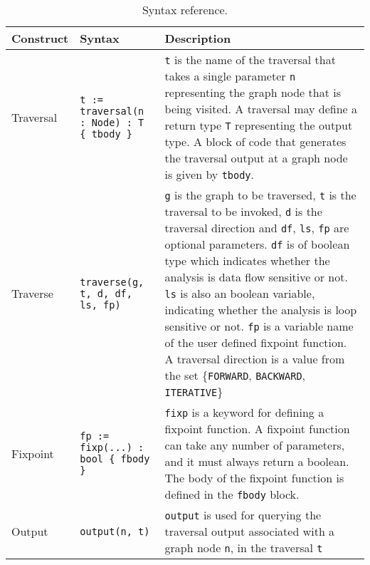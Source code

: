 \begin{table*}[ht!] \centering \small
\caption{Syntax reference.}
\label{tab:syntax}
\begin{tabular}{|p{1.5cm}|p{2.5cm}|p{11cm}|}
\hline 
\textbf{Construct} & \textbf{Syntax} & \textbf{Description}\\\hline
Traversal & \lstinline|t := traversal(n : Node) : T { tbody }| & \lstinline|t| is the name of the traversal that takes a single parameter \lstinline|n| representing the graph node that is being visited. A traversal may define a return type \lstinline|T| representing the output type. A block of code that generates the traversal output at a graph node is given by \lstinline|tbody|.\\\hline
Traverse & \lstinline|traverse(g, t, d, df, ls, fp)| & \lstinline|g| is the
graph to be traversed, \lstinline|t| is the traversal to be invoked,
\lstinline|d| is the traversal direction and \lstinline|df|, \lstinline|ls|, \lstinline|fp| are optional
parameters. \lstinline|df| is of boolean type which indicates whether the analysis is data flow sensitive or not. \lstinline|ls| is also an boolean variable, indicating whether the analysis is loop sensitive or not. \lstinline|fp| is a variable name of the user defined fixpoint function. A traversal direction is a value from the set \{\lstinline|FORWARD|,
\lstinline|BACKWARD|, \lstinline|ITERATIVE|\}\\\hline 
Fixpoint & \lstinline|fp := fixp(...) : bool { fbody }| & \lstinline|fixp| is a keyword for defining a fixpoint function. A fixpoint function can take any number of parameters, and it
must always return a boolean. The body of the fixpoint function is defined in
the \lstinline|fbody| block.\\\hline 
Output & \lstinline|output(n, t)| & \lstinline|output| is used for querying the
traversal output associated with a graph node \lstinline|n|, in the traversal
\lstinline|t|\\\hline 
\end{tabular}
\end{table*}
